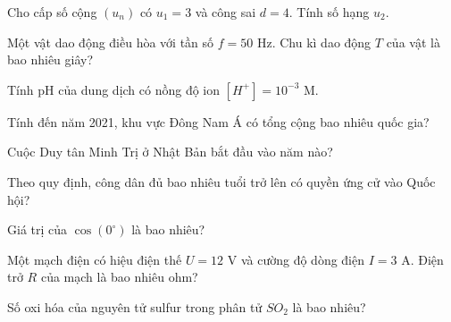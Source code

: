 \begin{ex}
    Cho cấp số cộng $(u_n)$ có $u_1 = 3$ và công sai $d = 4$. Tính số hạng $u_2$.
\end{ex}
\begin{ex}
    Một vật dao động điều hòa với tần số $f = 50$ Hz. Chu kì dao động $T$ của vật là bao nhiêu giây?
\end{ex}
\begin{ex}
    Tính pH của dung dịch có nồng độ ion $[H^+] = 10^{-3}$ M.
\end{ex}
\begin{ex}
    Tính đến năm 2021, khu vực Đông Nam Á có tổng cộng bao nhiêu quốc gia?
\end{ex}
\begin{ex}
    Cuộc Duy tân Minh Trị ở Nhật Bản bắt đầu vào năm nào?
\end{ex}
\begin{ex}
    Theo quy định, công dân đủ bao nhiêu tuổi trở lên có quyền ứng cử vào Quốc hội?
\end{ex}
\begin{ex}
    Giá trị của $\cos(0^\circ)$ là bao nhiêu?
\end{ex}
\begin{ex}
    Một mạch điện có hiệu điện thế $U = 12$ V và cường độ dòng điện $I = 3$ A. Điện trở $R$ của mạch là bao nhiêu ohm?
\end{ex}
\begin{ex}
    Số oxi hóa của nguyên tử sulfur trong phân tử $SO_2$ là bao nhiêu?
\end{ex}
